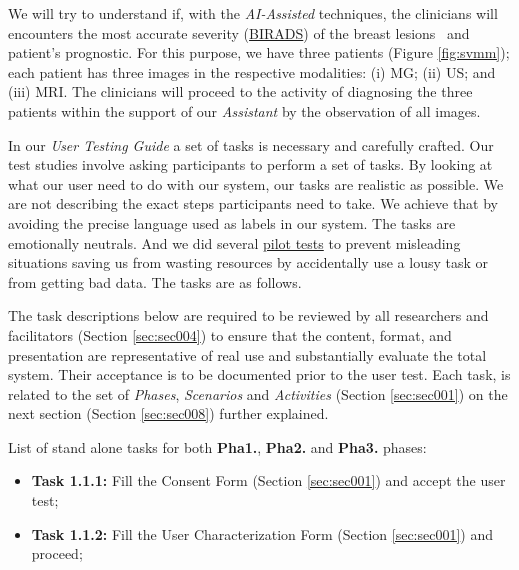 \hfill


We will try to understand if, with the \textit{AI-Assisted} techniques, the clinicians will encounters the most accurate severity (\hyperlink{https://en.wikipedia.org/wiki/BI-RADS}{BIRADS}) of the breast lesions~\cite{american1998breast} and patient's prognostic. For this purpose, we have three patients (Figure \ref{fig:svmm}); each patient has three images in the respective modalities: (i) \gls{MG}; (ii) \gls{US}; and (iii) \gls{MRI}. The clinicians will proceed to the activity of diagnosing the three patients within the support of our \textit{Assistant} by the observation of all images.

\hfill

In our \textit{User Testing Guide} a set of tasks is necessary and carefully crafted. Our test studies involve asking participants to perform a set of tasks. By looking at what our user need to do with our system, our tasks are realistic as possible. We are not describing the exact steps participants need to take. We achieve that by avoiding the precise language used as labels in our system. The tasks are emotionally neutrals. And we did several \hyperlink{https://www.nngroup.com/articles/pilot-testing/}{pilot tests} to prevent misleading situations saving us from wasting resources by accidentally use a lousy task or from getting bad data. The tasks are as follows.

The task descriptions below are required to be reviewed by all researchers and facilitators (Section \ref{sec:sec004}) to ensure that the content, format, and presentation are representative of real use and substantially evaluate the total system. Their acceptance is to be documented prior to the user test. Each task, is related to the set of {\it Phases}, {\it Scenarios} and {\it Activities} (Section \ref{sec:sec001}) on the next section (Section \ref{sec:sec008}) further explained.

\clearpage


List of stand alone tasks for both {\bf Pha1.}, {\bf Pha2.} and {\bf Pha3.} phases:


\hfill

\begin{itemize}
\item[] \textbf{Task 1.1.1:} Fill the Consent Form (Section \ref{sec:sec001}) and accept the user test;
\item[] \textbf{Task 1.1.2:} Fill the User Characterization Form (Section \ref{sec:sec001}) and proceed;
\end{itemize}

